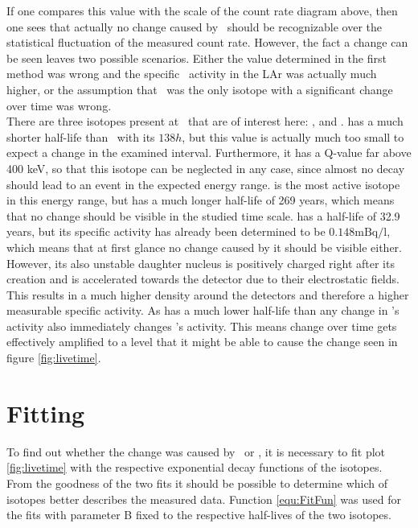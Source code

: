 \documentclass[encoding=utf8,british]{tumphthesis}
\begin{document}
If one compares this value with the scale of the count rate diagram above, then one sees that actually no change caused by \Kr\ should be recognizable over the statistical fluctuation of the measured count rate.
However, the fact a change can be seen leaves two possible scenarios.
Either the value determined in the first method was wrong and the specific \Kr\ activity in the LAr was actually much higher, or the assumption that \Kr\ was the only isotope with a significant change over time was wrong.
\\

There are three isotopes present at \gerda\ that are of interest here: ,  and .
 has a much shorter half-life than \Kr\ with its $138 h$, but this value is actually much too small to expect a change in the examined interval. 
Furthermore, it has a Q-value far above 400 keV, so that this isotope can be neglected in any case, since almost no decay should lead to an event in the expected energy range. 
 is the most active isotope in this energy range, but has a much longer half-life of 269 years, which means that no change should be visible in the studied time scale.
 has a half-life of 32.9 years, but its specific activity has already been determined to be $0.148\mathrm{mBq/l}$, which means that at first glance no change caused by it should be visible either.
However, its also unstable daughter nucleus  is positively charged right after its creation and is accelerated towards the detector due to their electrostatic fields.
This results in a much higher  density around the detectors and therefore a higher measurable specific activity.
As  has a much lower half-life than  any change in 's activity also immediately changes 's activity.
This means  change over time gets effectively amplified to a level that it might be able to cause the change seen in figure \ref{fig:livetime}.
\\

\section{Fitting}

To find out whether the change was caused by \Kr\ or , it is necessary to fit  plot \ref{fig:livetime} with the respective exponential decay functions of the isotopes.
From the goodness of the two fits it should be possible to determine which of isotopes better describes the measured data.
Function \ref{equ:FitFun} was used for the fits  with parameter B fixed to the respective half-lives of the two isotopes.
\end{document}
